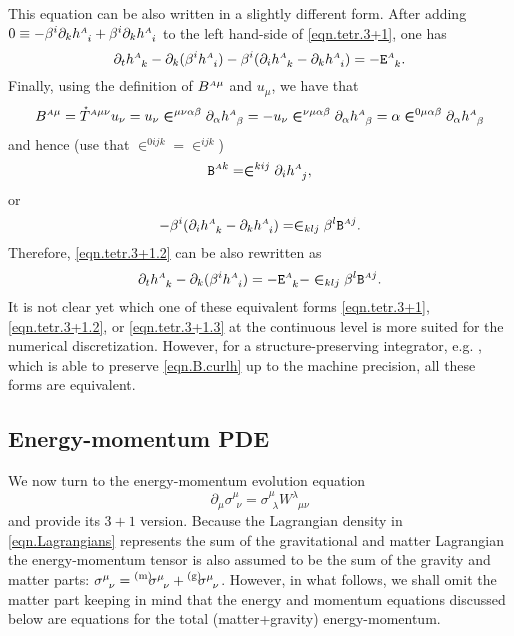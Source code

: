 \documentclass[
10pt, %
a4paper, %
oneside, %
headinclude,footinclude, %
BCOR5mm, %
]{scrartcl}
\newcommand{\sA}{\mathsmaller A}
\newcommand{\pd}[1]{\partial_{#1}}
\newcommand{\tetrsymbol}{h}
\newcommand{\tetr}[2]{\tetrsymbol^{#1}_{\phantom{#1}#2}}
\newcommand{\aD}[2]{\mathcal{D}_{\phantom{#2}#1}^{#2}}	%
\newcommand{\Efin}[2]{\mathtt{E}^{#1}_{\phantom{#1}#2}}	%
\newcommand{\BT}[2]{B^{#1#2}}	%
\newcommand{\Bfin}[2]{\mathtt{B}^{#1#2}}	%
\newcommand{\w}[2]{W^{#1}_{\phantom{#1}#2}}
\newcommand{\aU}{\mathcal{U}}%
\newcommand{\EMmat}[2]{\sigma^{#1}_{\ \,#2}}
\newcommand{\LCsymb}{\bm{\in}}    %
\newcommand{\mat}[1]{\prescript{\text{(m)}}{}{\hspace{-0.1cm}#1}}
\newcommand{\gra}[1]{\prescript{\text{(g)}}{}{\hspace{-0.1cm}#1}}
\newcommand{\HDT}[1]{\accentset{\star}{T}^{#1}}
\begin{document}
This equation can be also written in a slightly different form. After adding $ 0\equiv - \beta^i 
\pd{k}\tetr{\sA}{i} + \beta^i \pd{k}\tetr{\sA}{i} $ to the left hand-side of \eqref{eqn.tetr.3+1}, 
one 
has  
\begin{equation}\label{eqn.tetr.3+1.2}
	\pd{t} \tetr{\sA}{k} - \pd{k} (\beta^i \tetr{\sA}{i}) - \beta^i (\pd{i}\tetr{\sA}{k} - 
	\pd{k}\tetr{\sA}{i})
	= 
	-\Efin{\sA}{k}.
\end{equation}
Finally, using the definition of $ \BT{\sA}{\mu} $ and $ u_\mu $, we have that 
\begin{equation}
	\BT{\sA}{\mu} = \HDT{\sA\mu\nu} u_\nu = u_\nu \LCsymb^{\mu\nu\alpha\beta} 
	\pd{\alpha}\tetr{\sA}{\beta} = -
	u_\nu \LCsymb^{\nu\mu\alpha\beta} \pd{\alpha}\tetr{\sA}{\beta} =
	\alpha \LCsymb^{0\mu\alpha\beta} \pd{\alpha}\tetr{\sA}{\beta} 
\end{equation}
and hence (use that $ \LCsymb^{0ijk} =\LCsymb^{ijk} $)
\begin{equation}\label{eqn.B.curlh}
	\Bfin{\sA}{k} = \LCsymb^{kij}\pd{i}\tetr{\sA}{j},
\end{equation}
or
\begin{equation}
	-\beta^i (\pd{i}\tetr{\sA}{k} - 
	\pd{k}\tetr{\sA}{i})
	=
	\LCsymb_{klj}\beta^l \Bfin{\sA}{j}.
\end{equation}
Therefore, \eqref{eqn.tetr.3+1.2} can be also rewritten as 
\begin{equation}\label{eqn.tetr.3+1.3}
	\pd{t} \tetr{\sA}{k} - \pd{k} (\beta^i \tetr{\sA}{i}) =  
	-\Efin{\sA}{k} - \LCsymb_{klj} \beta^l \Bfin{\sA}{j}.
\end{equation}
It is not clear yet which one of these equivalent forms \eqref{eqn.tetr.3+1}, \eqref{eqn.tetr.3+1.2}, 
or 
\eqref{eqn.tetr.3+1.3} at the continuous level is more suited for the numerical discretization. 
However, for a structure-preserving integrator, e.g. \cite{SIGPR2021}, which is able  to 
preserve \eqref{eqn.B.curlh} up to the machine precision, all these forms are equivalent.





\subsection{Energy-momentum PDE}\label{sec.energymomentum}

We now turn to the energy-momentum evolution equation
\begin{equation}\label{eqn.sigma.31}
	\pd{\mu}\EMmat{\mu}{\nu} 
	 = \EMmat{\mu}{\lambda} 
	\w{\lambda}{\mu\nu}
\end{equation}
and provide its $ 3+1 $ version. Because the Lagrangian density in \eqref{eqn.Lagrangians} 
represents the sum of the gravitational and matter Lagrangian the energy-momentum tensor is also 
assumed to be the sum of the gravity and matter parts: $ \EMmat{\mu}{\nu} = \mat{\EMmat{\mu}{\nu}} 
+ 
\gra{\EMmat{\mu}{\nu}} $. However, in what follows, we shall omit the matter part keeping in mind 
that the energy and momentum equations discussed below are equations for the total (matter+gravity) 
energy-momentum. 
\end{document}
